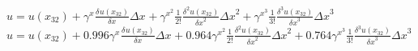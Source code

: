 $u = u({{x}}_{32}) + {{\gamma}^{{{x}^{}}}{\frac{{\delta}^{}u({{x}}_{32})}{{\delta x}^{}}}{\Delta x}^{}} + {{\gamma}^{{{x}^{2}}}\frac{1}{{2!}}{\frac{{\delta}^{2}u({{x}}_{32})}{{\delta x}^{2}}}{\Delta x}^{2}} + {{\gamma}^{{{x}^{3}}}\frac{1}{{3!}}{\frac{{\delta}^{3}u({{x}}_{32})}{{\delta x}^{3}}}{\Delta x}^{3}}$
$u = u({{x}}_{32}) + 0.996{{\gamma}^{{{x}^{}}}{\frac{{\delta}^{}u({{x}}_{32})}{{\delta x}^{}}}{\Delta x}^{}} + 0.964{{\gamma}^{{{x}^{2}}}\frac{1}{{2!}}{\frac{{\delta}^{2}u({{x}}_{32})}{{\delta x}^{2}}}{\Delta x}^{2}} + 0.764{{\gamma}^{{{x}^{3}}}\frac{1}{{3!}}{\frac{{\delta}^{3}u({{x}}_{32})}{{\delta x}^{3}}}{\Delta x}^{3}}$
